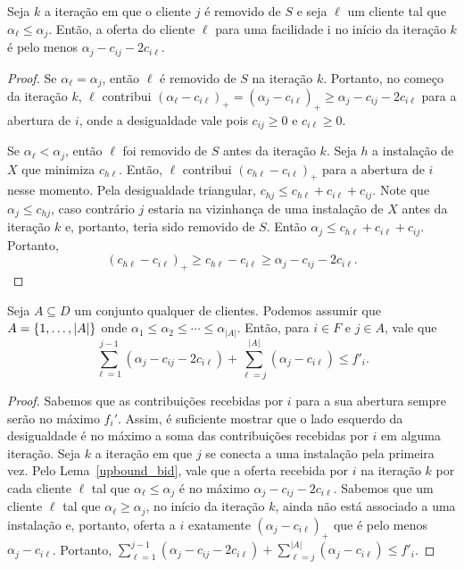 \begin{lemma}
    \label{upbound_bid}
    Seja $k$ a iteração em que o cliente $j$ é removido de $S$ e seja $\ell$ um cliente tal que $\alpha_\ell \leq \alpha_j$. Então, a oferta do cliente $\ell$ para uma facilidade i no início da iteração $k$ é pelo menos $\alpha_j - c_{ij} - 2c_{i\ell}$.
\end{lemma}

\begin{proof}
Se $\alpha_\ell = \alpha_j$, então $\ell$ é removido de $S$ na iteração $k$. Portanto, no começo da iteração $k$, $\ell$ contribui $(\alpha_\ell - c_{i\ell})_+ = (\alpha_j - c_{i\ell})_+ \geq \alpha_j - c_{ij} - 2c_{i\ell}$ para a abertura de $i$, onde a desigualdade vale pois $c_{ij}\geq 0$ e $c_{i\ell} \geq 0$.

Se $\alpha_\ell < \alpha_j $, então $\ell$ foi removido de $S$ antes da iteração $k$.
Seja $h$ a instalação de $X$ que minimiza $c_{h\ell}$.
Então, $\ell$ contribui $(c_{h\ell} - c_{i\ell})_+$ para a abertura de $i$ nesse momento. 
Pela desigualdade triangular, $c_{hj} \leq c_{h\ell} + c_{i\ell} + c_{ij}$. 
Note que $\alpha_j \leq c_{hj}$, caso contrário $j$ estaria na vizinhança de uma instalação de $X$ antes da iteração $k$ e, portanto, teria sido removido de $S$. Então $\alpha_j \leq c_{h\ell} + c_{i\ell } + c_{ij} $. 
Portanto,
\[ (c_{h\ell} - c_{i\ell})_+ \geq c_{h\ell} - c_{i\ell} \geq \alpha_j - c_{ij} - 2c_{i\ell}.\]
\end{proof}


\begin{lemma}
\label{lowerbound_fcost}
Seja $A \subseteq D$ um conjunto qualquer de clientes. Podemos assumir que $A = \{1,\ldots,|A|\}$ onde $\alpha_1 \leq \alpha_2 \leq \cdots \leq \alpha_{|A|}$. Então, para $i \in F$ e $j \in A$, vale que
\[ \sum_{\ell=1}^{j-1}(\alpha_j - c_{ij} - 2c_{i\ell}) + \sum_{\ell= j}^{|A|}(\alpha_j - c_{i\ell}) \leq f'_i.
\]
\end{lemma}
\begin{proof}
Sabemos que as contribuições recebidas por $i$ para a sua abertura sempre serão no máximo $f_i'$. Assim, é suficiente mostrar que o lado esquerdo da desigualdade é no máximo a soma das contribuições recebidas por $i$ em alguma iteração. Seja $k$ a iteração em que $j$ se conecta a uma instalação pela primeira vez. Pelo Lema~\ref{upbound_bid}, vale que a oferta recebida por $i$ na iteração $k$ por cada cliente $\ell$ tal que $\alpha_\ell \leq \alpha_j$ é no máximo $\alpha_j - c_{ij} - 2c_{i\ell}$. Sabemos que um cliente $\ell$ tal que $\alpha_\ell \geq \alpha_j$, no início da iteração $k$, ainda não está associado a uma instalação e, 
portanto, oferta a $i$ exatamente $(\alpha_j - c_{i\ell})_+$  que é pelo menos $\alpha_j - c_{i\ell}$. Portanto, $\sum_{\ell=1}^{j-1}(\alpha_j - c_{ij} - 2c_{i\ell}) + \sum_{\ell= j}^{|A|}(\alpha_j - c_{i\ell}) \leq f'_i$.
\end{proof}


